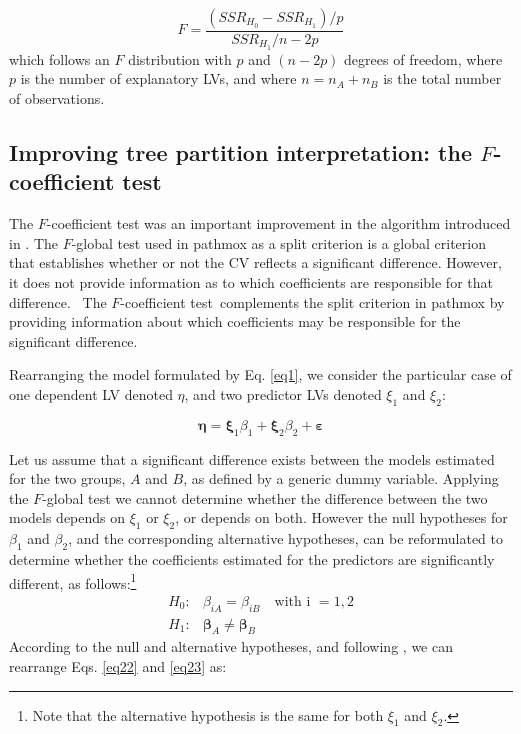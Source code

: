 \begin{equation}
\label{F_global}
F  = \frac{\left(SSR_{H_0}-SSR_{H_1}\right) \Bigg/p}{SSR_{H_1}\Bigg/n-2p}   
\end{equation}
which follows an $F$ distribution with $p$ and $\left(n - 2p\right)$ degrees of freedom, where $p$ is the number of explanatory LVs, and where $n = n_A + n_B$ is the total number of observations.

\subsection{Improving tree partition interpretation: the $F$-coefficient test}

The $F$-coefficient test was an important improvement in the algorithm introduced in \citet{Lamberti17}. The $F$-global test used in pathmox as a split criterion is a global criterion that establishes whether or not the CV reflects a significant difference. However, it does not provide information as to which coefficients are responsible for that difference.  The $F$-coefficient test complements the split criterion in pathmox by providing information about which coefficients may be responsible for the significant difference.

Rearranging  the model formulated by Eq. \ref{eq1}, we consider the particular case of one dependent LV denoted $\eta$, and two predictor LVs denoted $\xi_1$ and $\xi_2$: 

\begin{equation}
\label{eq4}
\boldsymbol{\eta} = \boldsymbol{\xi}_1\beta_1 + \boldsymbol{\xi}_2\beta_2 + \boldsymbol{\varepsilon}
\end{equation}

Let us assume that a significant difference exists between the models estimated for the two groups,  $A$ and $B$,  as defined by a generic dummy variable. Applying the $F$-global test \citep{Lamberti16} we cannot determine whether the difference between the two models depends on  $\xi_1$ or $\xi_2$, or depends on both. However the null hypotheses for $\beta_1$ and $\beta_2$, and the corresponding alternative hypotheses, can be reformulated to determine whether the coefficients estimated for the predictors are significantly different, as follows:\footnote{Note that the alternative hypothesis is the same for both  $\xi_1$ and $\xi_2$.} 
\begin{align}
\label{eq5}
H_0: &\beta_{iA} =\beta_{iB}  \quad  \text{with i }= 1, 2\\
H_1: &\boldsymbol{\beta}_A \ne \boldsymbol{\beta}_B
\end{align}
According to the null and alternative hypotheses, and following \citet{Lebart79},  we can rearrange Eqs. \ref{eq22} and \ref{eq23}  as:  


